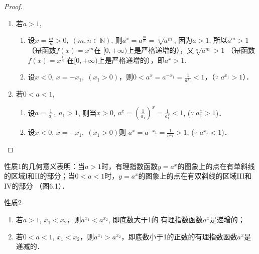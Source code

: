 \begin{proof}
\begin{enumerate}
\item 若$a>1$, 
\begin{enumerate}
  \item 设$x=\frac{m}{n}>0,\; (m,n\in\mathbb{N})$, 则$a^x=
a^{\tfrac{m}{n}}=\sqrt[n]{a^m}$, 因为$a>1$, 所以$a^m>1$ （幂函数$f(x)=x^m$在
$[0,+\infty)$上是严格递增的），又$\sqrt[n]{a^m}>1$ （幂函数$f(x)=x^{\tfrac{1}{n}}$
在$[0,+\infty)$上是严格递增的），即$a^x>1$.
\item 设$x<0$, 
$x=-x_1,\; (x_1>0)$，则$0<a^x=a^{-x_1}=\frac{1}{a^{x_1}}<1$，（$\because\; a^{x_1}>1$）．
\end{enumerate}
 
\item 若$0<a<1$, 
\begin{enumerate}
  \item 设$a=\frac{1}{a_1},\; a_1>1$, 则当$x>0$, $a^x=\left(\frac{1}{a_1}\right)^x=\frac{1}{a^x_1}<1$, ($\because\; a_1^{x}>1$)．
  \item 设$x<0$, $x=-x_1,\; (x_1>0)$则
$a^x=a^{-x_1}=\frac{1}{a^{x_1}}>1$, ($\because\; a^{x_1}<1$)．
\end{enumerate}
\end{enumerate}
\end{proof}

性质1的几何意义表明：当$a>1$时，有理指数函数$y=
a^x$的图象上的点在有单斜线的区域I和II的部分；当$0<a<
1$时，$y=a^x$的图象上的点在有双斜线的区域III和IV的部分
（图6.1）．

\begin{figure}[htp]
  \centering
{}
  \caption{}
\end{figure}

\begin{blk}{性质2}
\begin{enumerate}
  \item 若$a>1$, $x_1<x_2$，则$a^{x_1}<a^{x_2}$, 即底数大于1的
有理指数函数$a^x$是递增的；
\item 若$0<a<1$, $x_1<x_2$，则$a^{x_1}>a^{x_2}$，即底数小于1的正数的有理指数函数$a^x$是递减的．
\end{enumerate}
\end{blk}

